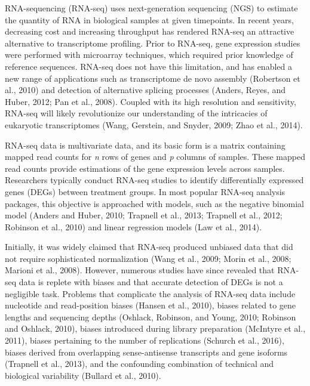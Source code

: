 \documentclass[11pt] {article}
\begin{document}
RNA-sequencing (RNA-seq) uses next-generation sequencing (NGS) to estimate the quantity of RNA in biological samples at given timepoints. In recent years, decreasing cost and increasing throughput has rendered RNA-seq an attractive alternative to transcriptome profiling. Prior to RNA-seq, gene expression studies were performed with microarray techniques, which required prior knowledge of reference sequences. RNA-seq does not have this limitation, and has enabled a new range of applications such as transcriptome de novo assembly (Robertson et al., 2010) and detection of alternative splicing processes (Anders, Reyes, and Huber, 2012; Pan et al., 2008). Coupled with its high resolution and sensitivity, RNA-seq will likely revolutionize our understanding of the intricacies of eukaryotic transcriptomes (Wang, Gerstein, and Snyder, 2009; Zhao et al., 2014).

RNA-seq data is multivariate data, and its basic form is a matrix containing mapped read counts for \textit{n} rows of genes and \textit{p} columns of samples. These mapped read counts provide estimations of the gene expression levels across samples. Researchers typically conduct RNA-seq studies to identify differentially expressed genes (DEGs) between treatment groups. In most popular RNA-seq analysis packages, this objective is approached with models, such as the negative binomial model (Anders and Huber, 2010; Trapnell et al., 2013; Trapnell et al., 2012; Robinson et al., 2010) and linear regression models (Law et al., 2014).

Initially, it was widely claimed that RNA-seq produced unbiased data that did not require sophisticated normalization (Wang et al., 2009; Morin et al., 2008; Marioni et al., 2008). However, numerous studies have since revealed that RNA-seq data is replete with biases and that accurate detection of DEGs is not a negligible task. Problems that complicate the analysis of RNA-seq data include nucleotide and read-position biases (Hansen et al., 2010), biases related to gene lengths and sequencing depths (Oshlack, Robinson, and Young, 2010; Robinson and Oshlack, 2010), biases introduced during library preparation (McIntyre et al., 2011), biases pertaining to the number of replications (Schurch et al., 2016), biases derived from overlapping sense-antisense transcripts and gene isoforms (Trapnell et al., 2013), and the confounding combination of technical and biological variability (Bullard et al., 2010).
\end{document}
